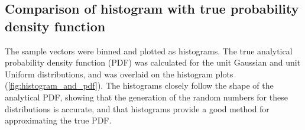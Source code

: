 \documentclass[a4paper]{article}
\begin{document}

\subsection{Comparison of histogram with true probability density function}

The sample vectors were binned and plotted as histograms.
The true analytical probability density function (PDF) was calculated for the unit Gaussian and unit Uniform
distributions, and was overlaid on the histogram plots (\autoref{fig:histogram_and_pdf}).
The histograms closely follow the shape of the analytical PDF, showing that the generation of the random numbers for
these distributions is accurate, and that histograms provide a good method for approximating the true PDF.
\end{document}
